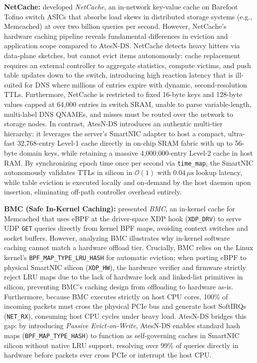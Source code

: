 \documentclass[a4paper,fleqn,colorlinks,hidelinks]{cas-sc}
\begin{document}
\textbf{NetCache:} \citet{10.1145/3132747.3132764} developed \textit{NetCache}, an in-network key-value cache on Barefoot Tofino switch ASICs that absorbs load skews in distributed storage systems (e.g., Memcached) at over two billion queries per second. However, NetCache's hardware caching pipeline reveals fundamental differences in eviction and application scope compared to AtesN-DS. NetCache detects heavy hitters via data-plane sketches, but cannot evict items autonomously: cache replacement requires an external controller to aggregate statistics, compute victims, and push table updates down to the switch, introducing high reaction latency that is ill-suited for DNS where millions of entries expire with dynamic, second-resolution TTLs. Furthermore, NetCache is restricted to fixed 16-byte keys and 128-byte values capped at 64,000 entries in switch SRAM, unable to parse variable-length, multi-label DNS QNAMEs, and misses must be routed over the network to storage nodes. In contrast, AtesN-DS introduces an authentic multi-tier hierarchy: it leverages the server's SmartNIC adapter to host a compact, ultra-fast 32,768-entry Level-1 cache directly in on-chip SRAM fabric with up to 56-byte domain keys, while retaining a massive 4,000,000-entry Level-2 cache in host RAM. By synchronizing epoch time once per second via \texttt{time\_map}, the SmartNIC autonomously validates TTLs in silicon in $\mathcal{O}(1)$ with $0.04\,\mu\text{s}$ lookup latency, while table eviction is executed locally and on-demand by the host daemon upon insertion, eliminating off-path controller overhead entirely.

\textbf{BMC (Safe In-Kernel Caching):} \citet{performance:bmc} presented \textit{BMC}, an in-kernel cache for Memcached that uses eBPF at the driver-space XDP hook (\texttt{XDP\_DRV}) to serve UDP \texttt{GET} queries directly from kernel BPF maps, avoiding context switches and socket buffers. However, analyzing BMC illustrates why in-kernel software caching cannot match a hardware offload tier. Crucially, BMC relies on the Linux kernel's \texttt{BPF\_MAP\_TYPE\_LRU\_HASH} for automatic eviction; when porting eBPF to physical SmartNIC silicon (\texttt{XDP\_HW}), the hardware verifier and firmware strictly reject LRU maps due to the lack of hardware lock and linked-list primitives in silicon, preventing BMC's caching design from offloading to hardware as-is. Furthermore, because BMC executes strictly on host CPU cores, 100\% of incoming packets must cross the physical PCIe bus and generate host SoftIRQs (\texttt{NET\_RX}), consuming host CPU cycles under heavy load. AtesN-DS bridges this gap: by introducing \textit{Passive Evict-on-Write}, AtesN-DS enables standard hash maps (\texttt{BPF\_MAP\_TYPE\_HASH}) to function as self-governing caches in SmartNIC silicon without native LRU support, resolving over 99\% of queries directly in hardware before packets ever cross PCIe or interrupt the host CPU.
\end{document}

